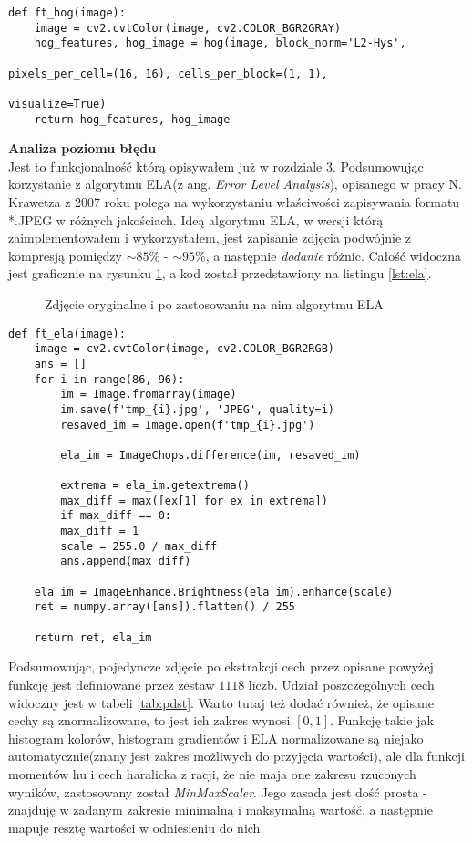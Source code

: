 \begin{lstlisting}[caption={Implementacja wyliczania histogramu gradientów}, label={lst:hog}]
def ft_hog(image):
	image = cv2.cvtColor(image, cv2.COLOR_BGR2GRAY)
	hog_features, hog_image = hog(image, block_norm='L2-Hys', 
															  pixels_per_cell=(16, 16), cells_per_block=(1, 1), 
															  visualize=True)
	return hog_features, hog_image
\end{lstlisting}

\textbf{Analiza poziomu błędu} \\

Jest to funkcjonalność którą opisywałem już w rozdziale 3. Podsumowując korzystanie z algorytmu ELA(z ang. \textit{Error Level Analysis}), opisanego w pracy N. Krawetza z 2007 roku\cite{hacker} polega na wykorzystaniu właściwości zapisywania formatu *.JPEG w różnych jakościach. Ideą algorytmu ELA, w wersji którą zaimplementowałem i wykorzystałem, jest zapisanie zdjęcia podwójnie z kompresją pomiędzy $\sim85\%$ - $\sim95\%$, a następnie \textit{dodanie} różnic. Całość widoczna jest graficznie na rysunku \ref{fig:ela}, a kod został przedstawiony na listingu \ref{lst:ela}.

\begin{figure}[h!]
	\centering
	\qquad
	\caption{Zdjęcie oryginalne i po zastosowaniu na nim algorytmu ELA}
	\label{fig:ela}
\end{figure}

\begin{lstlisting}[caption={Implementacja realizacji analizy poziomu błędów}, label={lst:ela}]
def ft_ela(image):
	image = cv2.cvtColor(image, cv2.COLOR_BGR2RGB)
	ans = []
	for i in range(86, 96):
		im = Image.fromarray(image)
		im.save(f'tmp_{i}.jpg', 'JPEG', quality=i)
		resaved_im = Image.open(f'tmp_{i}.jpg')
		
		ela_im = ImageChops.difference(im, resaved_im)
		
		extrema = ela_im.getextrema()
		max_diff = max([ex[1] for ex in extrema])
		if max_diff == 0:
		max_diff = 1
		scale = 255.0 / max_diff
		ans.append(max_diff)
	
	ela_im = ImageEnhance.Brightness(ela_im).enhance(scale)
	ret = numpy.array([ans]).flatten() / 255
	
	return ret, ela_im
\end{lstlisting}

Podsumowując, pojedyncze zdjęcie po ekstrakcji cech przez opisane powyżej funkcję jest definiowane przez zestaw $1118$ liczb. Udział poszczególnych cech widoczny jest w tabeli \ref{tab:pdst}.  Warto tutaj też dodać również, że opisane cechy są znormalizowane, to jest ich zakres wynosi $\left [ 0,1 \right ]$. Funkcję takie jak histogram kolorów, histogram gradientów i ELA normalizowane są niejako automatycznie(znany jest zakres możliwych do przyjęcia wartości), ale dla funkcji momentów hu i cech haralicka z racji, że nie maja one zakresu rzuconych wyników, zastosowany został \textit{MinMaxScaler}. Jego zasada jest dość prosta - znajduję w zadanym zakresie minimalną i maksymalną wartość, a następnie mapuje resztę wartości w odniesieniu do nich.  \\

